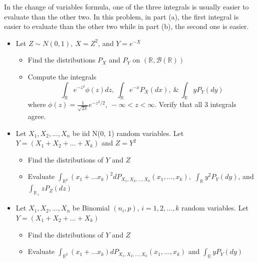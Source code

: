 \documentclass[12pt,letterpaper, onecolumn]{exam}
\newcommand{\real}{\mathbb{R}}
\newcommand{\borel}{\mathcal{B}(\mathbb{R})}
\begin{document}
\begin{questions}
    In the change of variables formula, one of the three integrals is usually easier to evaluate than the other two. In this problem, in part (a), the first integral is easier to evaluate than the other two while in part (b), the second one is easier.
    \begin{itemize}
        \item[(a)] Let $Z \sim N(0, 1), \: X = Z^2$, and $Y = e^{-X}$
        \begin{itemize}
            \item[(i)] Find the distributions $P_X$ and $P_Y$ on $(\real, \borel)$
            \item[(ii)] Compute the integrals
            \[\int_{\real} e^{-z^2}\phi(z)dz, \: \int_{\real}e^{-x}P_X(dx), \: \& \: \int_{\real} y P_Y(dy)\]
            where $\phi(z) = \frac{1}{\sqrt{2\pi}}e^{-z^2/2}, \: -\infty < z < \infty$. Verify that all 3 integrals agree.
        \end{itemize}
        \item[(b)] Let $X_1, X_2, ... , X_n$ be iid N(0, 1) random variables. Let $Y = (X_1 + X_2 + ... + X_k)$ and $Z = Y^2$
        \begin{itemize}
            \item[(i)] Find the distributions of $Y$ and $Z$ 
            \item[(ii)] Evaluate $\int_{\real^k}(x_1 + ... x_k)^2 dP_{X_1, X_2, ... , X_k}(x_1, ... , x_k),$ $\int_{\real}y^2P_Y(dy)$, and $\int_{\real_+}zP_Z(dz)$ 
        \end{itemize}
        \item[(c)] Let $X_1, X_2, ... , X_n$ be Binomial $(n_i, p)$, $i = 1, 2, ..., k$ random variables. Let $Y = (X_1 + X_2 + ... + X_k)$
        \begin{itemize}
            \item[(i)] Find the distributions of $Y$ and $Z$ 
            \item[(ii)] Evaluate $\int_{\real^k}(x_1 + ... x_k) dP_{X_1, X_2, ... , X_k}(x_1, ... , x_k)$ and $\int_{\real}yP_Y(dy)$ 
        \end{itemize}
    \end{itemize}


\end{questions}
\end{document}
